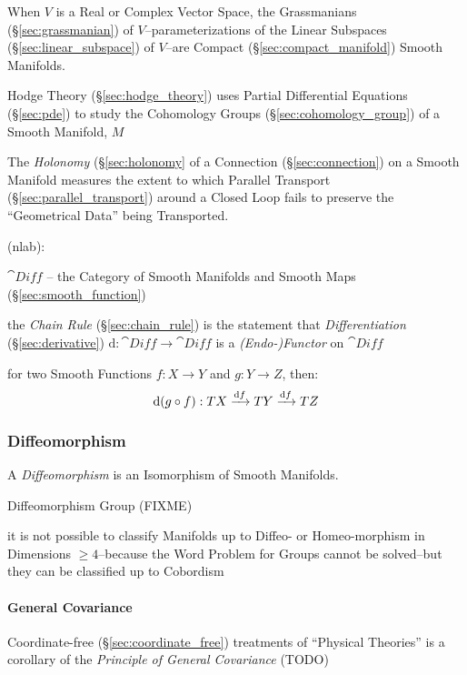 When $V$ is a Real or Complex Vector Space, the Grassmanians
(\S\ref{sec:grassmanian}) of $V$--parameterizations of the Linear Subspaces
(\S\ref{sec:linear_subspace}) of $V$--are Compact (\S\ref{sec:compact_manifold})
Smooth Manifolds.

\fist Hodge Theory (\S\ref{sec:hodge_theory}) uses Partial Differential
Equations (\S\ref{sec:pde}) to study the Cohomology Groups
(\S\ref{sec:cohomology_group}) of a Smooth Manifold, $M$

\fist The \emph{Holonomy} (\S\ref{sec:holonomy} of a Connection
(\S\ref{sec:connection}) on a Smooth Manifold measures the extent to which
Parallel Transport (\S\ref{sec:parallel_transport}) around a Closed Loop fails
to preserve the ``Geometrical Data'' being Transported.

(nlab):

$\cat{Diff}$ -- the Category of Smooth Manifolds and Smooth Maps
(\S\ref{sec:smooth_function})

the \emph{Chain Rule} (\S\ref{sec:chain_rule}) is the statement that
\emph{Differentiation} (\S\ref{sec:derivative}) $\mathrm{d} : \cat{Diff}
\rightarrow \cat{Diff}$ is a \emph{(Endo-)Functor} on $\cat{Diff}$

for two Smooth Functions $f : X \rightarrow Y$ and $g : Y \rightarrow Z$, then:
\[
  \mathrm{d}(g \circ f) : TX \xrightarrow{\mathrm{d}f} TY \xrightarrow{\mathrm{d}f} TZ
\]



\subsubsection{Diffeomorphism}\label{sec:diffeomorphism}

A \emph{Diffeomorphism} is an Isomorphism of Smooth Manifolds.

Diffeomorphism Group (FIXME)

it is not possible to classify Manifolds up to Diffeo- or Homeo-morphism in
Dimensions $\geq 4$--because the Word Problem for Groups cannot be solved--but
they can be classified up to Cobordism




\paragraph{General Covariance}\label{sec:general_covariance}\hfill

Coordinate-free (\S\ref{sec:coordinate_free}) treatments of ``Physical
Theories'' is a corollary of the \emph{Principle of General Covariance} (TODO)




